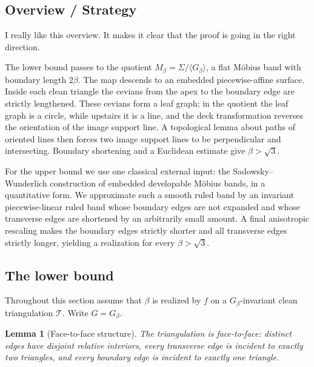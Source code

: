 \documentclass[12pt]{article}
\theoremstyle{plain}
\newtheorem{lemma}[theorem]{Lemma}
\newcommand{\review}[1]{\begin{reviewbox}#1\end{reviewbox}}
\begin{document}
\subsection*{Overview / Strategy}



\review{I really like this overview. It makes it clear that the proof is going in the right direction.}

The lower bound passes to the quotient
\(M_\beta=\Sigma/\langle G_\beta\rangle\), a flat M\"obius band with boundary
length \(2\beta\).  The map descends to an embedded piecewise-affine surface.
Inside each clean triangle the cevians from the apex to the boundary edge are
strictly lengthened.  These cevians form a leaf graph; in the quotient the leaf
graph is a circle, while upstairs it is a line, and the deck transformation
reverses the orientation of the image support line.  A topological lemma about
paths of oriented lines then forces two image support lines to be perpendicular
and intersecting.  Boundary shortening and a Euclidean estimate give
\(\beta>\sqrt3\).

For the upper bound we use one classical external input: the
Sadowsky--Wunderlich construction of embedded developable M\"obius bands, in a
quantitative form.  We approximate such a smooth ruled band by an invariant
piecewise-linear ruled band whose boundary edges are not expanded and whose
transverse edges are shortened by an arbitrarily small amount.  A final
anisotropic rescaling makes the boundary edges strictly shorter and all
transverse edges strictly longer, yielding a realization for every
\(\beta>\sqrt3\).

\subsection{The lower bound}

Throughout this section assume that \(\beta\) is realized by \(f\) on a
\(G_\beta\)-invariant clean triangulation \(\mathcal T\).  Write
\(G=G_\beta\).

\begin{lemma}[Face-to-face structure]\label{lem:facetoface}
The triangulation is face-to-face: distinct edges have disjoint relative
interiors, every transverse edge is incident to exactly two triangles, and
every boundary edge is incident to exactly one triangle.
\end{lemma}
\end{document}

